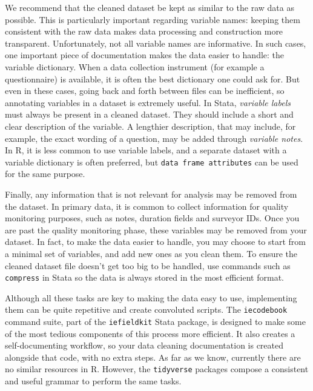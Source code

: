 We recommend that the cleaned dataset be kept as similar to the raw data as possible.
This is particularly important regarding variable names:
keeping them consistent with the raw data makes data processing and construction more transparent.
Unfortunately, not all variable names are informative.
In such cases, one important piece of documentation
 makes the data easier to handle: the variable dictionary.
When a data collection instrument (for example a questionnaire) is available,
it is often the best dictionary one could ask for.
But even in these cases, going back and forth between files can be inefficient,
so annotating variables in a dataset is extremely useful.
In Stata, \textit{variable labels}
must always be present in a cleaned dataset.
They should include a short and clear description of the variable.
A lengthier description, that may include, for example,
the exact wording of a question, may be added through \textit{variable notes}.
In R, it is less common to use variable labels,
and a separate dataset with a variable dictionary is often preferred,
but \texttt{data frame attributes} can be used for the same purpose.

Finally, any information that is not relevant for analysis may be removed from the dataset.
In primary data, it is common to collect information for quality monitoring purposes,
such as notes, duration fields and surveyor IDs.
Once you are past the quality monitoring phase,
these variables may be removed from your dataset.
In fact, to make the data easier to handle,
you may choose to start from a minimal set of variables,
and add new ones as you clean them.
To ensure the cleaned dataset file doesn't get too big to be handled,
use commands such as \texttt{compress} in Stata so the data
is always stored in the most efficient format.

Although all these tasks are key to making the data easy to use,
implementing them can be quite repetitive and create convoluted scripts.
The \texttt{iecodebook} command suite, part of the \texttt{iefieldkit} Stata package,
is designed to make some of the most tedious components of this process more efficient.
It also creates a self-documenting workflow,
so your data cleaning documentation is created alongside that code,
with no extra steps.
As far as we know, currently there are no similar resources in R.
However, the \texttt{tidyverse} packages
compose a consistent and useful grammar to perform the same tasks.

